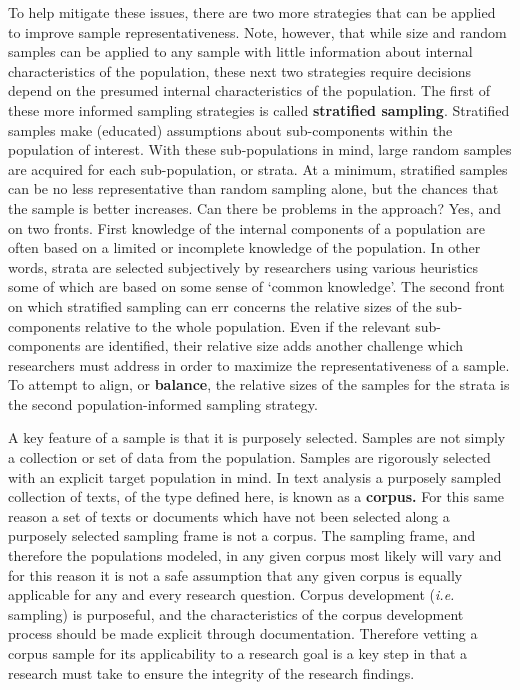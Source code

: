 \documentclass[
  letterpaper,
]{scrbook}
\begin{document}
To help mitigate these issues, there are two more strategies that can be
applied to improve sample representativeness. Note, however, that while
size and random samples can be applied to any sample with little
information about internal characteristics of the population, these next
two strategies require decisions depend on the presumed internal
characteristics of the population. The first of these more informed
sampling strategies is called \textbf{stratified sampling}. Stratified
samples make (educated) assumptions about sub-components within the
population of interest. With these sub-populations in mind, large random
samples are acquired for each sub-population, or strata. At a minimum,
stratified samples can be no less representative than random sampling
alone, but the chances that the sample is better increases. Can there be
problems in the approach? Yes, and on two fronts. First knowledge of the
internal components of a population are often based on a limited or
incomplete knowledge of the population. In other words, strata are
selected subjectively by researchers using various heuristics some of
which are based on some sense of `common knowledge'. The second front on
which stratified sampling can err concerns the relative sizes of the
sub-components relative to the whole population. Even if the relevant
sub-components are identified, their relative size adds another
challenge which researchers must address in order to maximize the
representativeness of a sample. To attempt to align, or
\textbf{balance}, the relative sizes of the samples for the strata is
the second population-informed sampling strategy.

A key feature of a sample is that it is purposely selected. Samples are
not simply a collection or set of data from the population. Samples are
rigorously selected with an explicit target population in mind. In text
analysis a purposely sampled collection of texts, of the type defined
here, is known as a \textbf{corpus.} For this same reason a set of texts
or documents which have not been selected along a purposely selected
sampling frame is not a corpus. The sampling frame, and therefore the
populations modeled, in any given corpus most likely will vary and for
this reason it is not a safe assumption that any given corpus is equally
applicable for any and every research question. Corpus development
(\emph{i.e.} sampling) is purposeful, and the characteristics of the
corpus development process should be made explicit through
documentation. Therefore vetting a corpus sample for its applicability
to a research goal is a key step in that a research must take to ensure
the integrity of the research findings.
\end{document}
